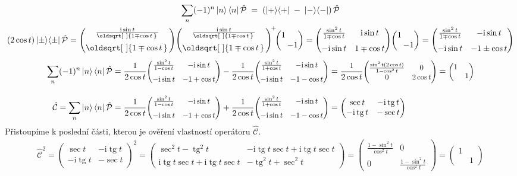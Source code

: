 \documentclass[10pt,a4paper]{article}
\renewcommand*{\sqrt}[2][\ ]{\oldsqrt[#1]{#2\,}\,}
\newcommand{\const}[1]{\text{#1}}
\newcommand{\mat}[1]{
    \begin{pmatrix}
        #1
    \end{pmatrix}
}
\newcommand{\smat}[2][1]{
    \scalebox{#1}{$\mat{#2}$}
}
\newcommand{\bra}[1]{\left< #1 \right|}
\newcommand{\ket}[1]{\left| #1 \right>}
\renewcommand{\i}{\const{i}}
\def\tg{\operatorname{tg}}
\def\Parity{\hat{\mathcal P}}
\def\Cop{\hat{\mathcal C}}
\begin{document}
\begin{gather*}
    \sum_n (-1)^n \ket{n} \bra{n} \Parity
    \; = \;
    \left(
        \ket{+} \! \bra{+}
        \; - \;
        \ket{-} \! \bra{-}
    \right)
    \Parity
    \\
    (2 \cos t)
    \ket\pm \! \bra\pm \Parity =
    \mat{
        \frac{\i \sin t}{\sqrt{1 \mp \cos t}} \\[7pt]
        \sqrt{1 \mp \cos t}
    } \!
    \mat{
        \frac{\i \sin t}{\sqrt{1 \mp \cos t}} \\[7pt]
        \sqrt{1 \mp \cos t}
    }^{\!+} \!\!
    \mat{ 1 \\ & \hspace{-.8em} -1 }
    = \mat{
        \frac{\sin^2 t}{1 \mp \cos t} & \i \sin t \\[7pt]
        -\i \sin t & 1 \mp \cos t
    } \! \mat{ 1 \\ & \hspace{-.8em} -1 }
    = \mat{
        \frac{\sin^2 t}{1 \mp \cos t} & -\i \sin t \\[7pt]
        -\i \sin t & -1 \pm \cos t
    }
\end{gather*}
\begin{align*}
    \sum_n (-1)^n \ket{n} \bra{n} \Parity
    &=
    \frac{1}{2\cos t} \smat[0.9]{
        \frac{\sin^2 t}{1 - \cos t} & -\i \sin t \\[7pt]
        -\i \sin t & -1 + \cos t
    }
    -
    \frac{1}{2\cos t} \smat[0.9]{
        \frac{\sin^2 t}{1 + \cos t} & -\i \sin t \\[7pt]
        -\i \sin t & -1 - \cos t
    }
    = \frac{1}{2\cos t} \smat[0.9]{
        \frac{\sin^2 t (2 \cos t)}{1 - \cos^2 t} & 0 \\
        0 & 2 \cos t
    }
    = \smat[0.9]{1 \\ & 1}
    \\[10pt]
    \Cop = \sum_n \ket{n} \bra{n} \Parity
    &=
    \frac{1}{2\cos t} \smat[0.9]{
        \frac{\sin^2 t}{1 - \cos t} & -\i \sin t \\[7pt]
        -\i \sin t & -1 + \cos t
    }
    +
    \frac{1}{2\cos t} \smat[0.9]{
        \frac{\sin^2 t}{1 + \cos t} & -\i \sin t \\[7pt]
        -\i \sin t & -1 - \cos t
    }
    =
    \mat{
        \sec t & -\i \tg t \\
        -\i \tg t & -\sec t
    }
\end{align*}
Přistoupíme k poslední části, kterou je ověření vlastností operátoru $\Cop$.
\begin{align*}
    \Cop^2 =
    \mat{
        \sec t & -\i \tg t \\
        -\i \tg t & -\sec t
    }^2
    =
    \mat{
        \sec^2 t - \tg^2 t & -\i \tg t \sec t + \i \tg t \sec t \\
        \i \tg t \sec t + \i \tg t \sec t & - \tg^2 t + \sec^2 t
    }
    =
    \mat{
        \frac{1 - \sin^2 t}{\cos^2 t} & 0 \\
        0 & \frac{1 - \sin^2 t}{\cos^2 t}
    }
    =
    \mat{ 1 \\ & 1}
\end{align*}
\end{document}
